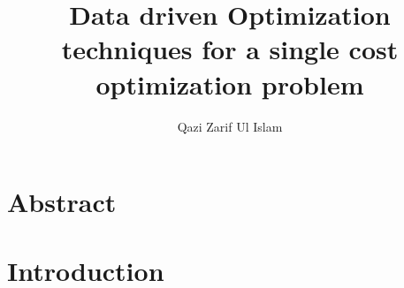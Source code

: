 \documentclass[12pt, letterpaper]{article}
\title{Data driven Optimization techniques for a single cost optimization problem}
\author{Qazi Zarif Ul Islam}
\begin{document}
\maketitle

\section{Abstract}

\section{Introduction}

\end{document}
